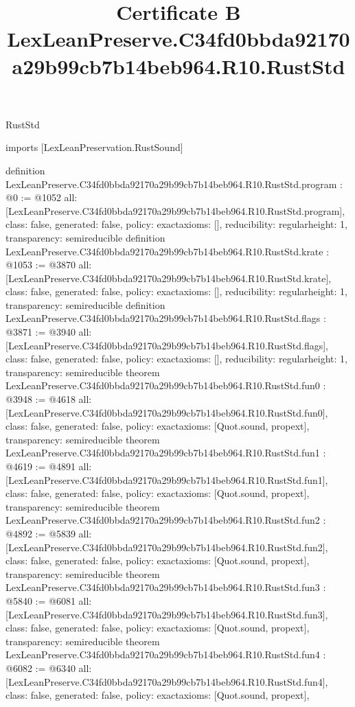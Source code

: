 \begin{lexlean}{RustStd}
\title{Certificate B LexLeanPreserve.C34fd0bbda92170a29b99cb7b14beb964.R10.RustStd}
\begin{coremodule}
imports [LexLeanPreservation.RustSound]

definition LexLeanPreserve.C34fd0bbda92170a29b99cb7b14beb964.R10.RustStd.program : @0 := @1052 {
  all: [LexLeanPreserve.C34fd0bbda92170a29b99cb7b14beb964.R10.RustStd.program],
  class: false,
  generated: false,
  policy: exact{axioms: []},
  reducibility: regular{height: 1},
  transparency: semireducible
}
definition LexLeanPreserve.C34fd0bbda92170a29b99cb7b14beb964.R10.RustStd.krate : @1053 := @3870 {
  all: [LexLeanPreserve.C34fd0bbda92170a29b99cb7b14beb964.R10.RustStd.krate],
  class: false,
  generated: false,
  policy: exact{axioms: []},
  reducibility: regular{height: 1},
  transparency: semireducible
}
definition LexLeanPreserve.C34fd0bbda92170a29b99cb7b14beb964.R10.RustStd.flags : @3871 := @3940 {
  all: [LexLeanPreserve.C34fd0bbda92170a29b99cb7b14beb964.R10.RustStd.flags],
  class: false,
  generated: false,
  policy: exact{axioms: []},
  reducibility: regular{height: 1},
  transparency: semireducible
}
theorem LexLeanPreserve.C34fd0bbda92170a29b99cb7b14beb964.R10.RustStd.fun0 : @3948 := @4618 {
  all: [LexLeanPreserve.C34fd0bbda92170a29b99cb7b14beb964.R10.RustStd.fun0],
  class: false,
  generated: false,
  policy: exact{axioms: [Quot.sound, propext]},
  transparency: semireducible
}
theorem LexLeanPreserve.C34fd0bbda92170a29b99cb7b14beb964.R10.RustStd.fun1 : @4619 := @4891 {
  all: [LexLeanPreserve.C34fd0bbda92170a29b99cb7b14beb964.R10.RustStd.fun1],
  class: false,
  generated: false,
  policy: exact{axioms: [Quot.sound, propext]},
  transparency: semireducible
}
theorem LexLeanPreserve.C34fd0bbda92170a29b99cb7b14beb964.R10.RustStd.fun2 : @4892 := @5839 {
  all: [LexLeanPreserve.C34fd0bbda92170a29b99cb7b14beb964.R10.RustStd.fun2],
  class: false,
  generated: false,
  policy: exact{axioms: [Quot.sound, propext]},
  transparency: semireducible
}
theorem LexLeanPreserve.C34fd0bbda92170a29b99cb7b14beb964.R10.RustStd.fun3 : @5840 := @6081 {
  all: [LexLeanPreserve.C34fd0bbda92170a29b99cb7b14beb964.R10.RustStd.fun3],
  class: false,
  generated: false,
  policy: exact{axioms: [Quot.sound, propext]},
  transparency: semireducible
}
theorem LexLeanPreserve.C34fd0bbda92170a29b99cb7b14beb964.R10.RustStd.fun4 : @6082 := @6340 {
  all: [LexLeanPreserve.C34fd0bbda92170a29b99cb7b14beb964.R10.RustStd.fun4],
  class: false,
  generated: false,
  policy: exact{axioms: [Quot.sound, propext]},
}
\end{coremodule}
\end{lexlean}

